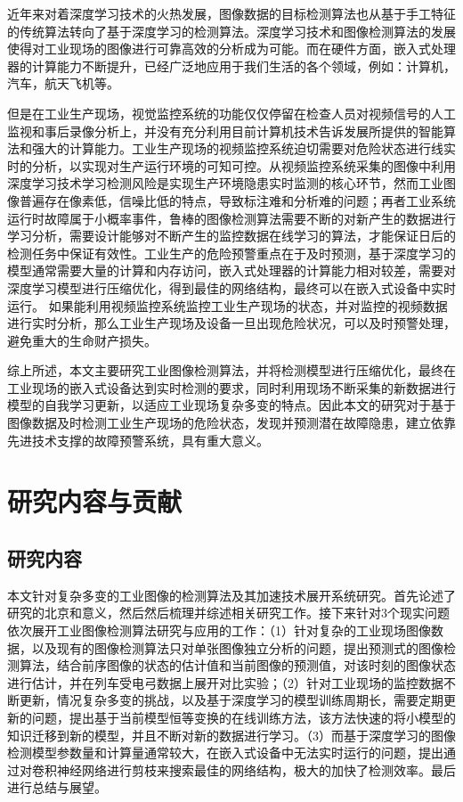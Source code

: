近年来对着深度学习技术的火热发展，图像数据的目标检测算法也从基于手工特征的传统算法转向了基于深度学习的检测算法\cite{deeplearing2018survey}。深度学习技术和图像检测算法的发展使得对工业现场的图像进行可靠高效的分析成为可能。而在硬件方面，嵌入式处理器的计算能力不断提升，已经广泛地应用于我们生活的各个领域，例如：计算机，汽车，航天飞机等。

但是在工业生产现场，视觉监控系统的功能仅仅停留在检查人员对视频信号的人工监视和事后录像分析上，并没有充分利用目前计算机技术告诉发展所提供的智能算法和强大的计算能力\cite{面向视觉监视实时跟踪的动态背景更新方法}。工业生产现场的视频监控系统迫切需要对危险状态进行线实时的分析，以实现对生产运行环境的可知可控。从视频监控系统采集的图像中利用深度学习技术学习检测风险是实现生产环境隐患实时监测的核心环节，然而工业图像普遍存在像素低，信噪比低的特点，导致标注难和分析难的问题；再者工业系统运行时故障属于小概率事件，鲁棒的图像检测算法需要不断的对新产生的数据进行学习分析，需要设计能够对不断产生的监控数据在线学习的算法，才能保证日后的检测任务中保证有效性。工业生产的危险预警重点在于及时预测，基于深度学习的模型通常需要大量的计算和内存访问，嵌入式处理器的计算能力相对较差，需要对深度学习模型进行压缩优化，得到最佳的网络结构，最终可以在嵌入式设备中实时运行。
如果能利用视频监控系统监控工业生产现场的状态，并对监控的视频数据进行实时分析，那么工业生产现场及设备一旦出现危险状况，可以及时预警处理，避免重大的生命财产损失。

综上所述，本文主要研究工业图像检测算法，并将检测模型进行压缩优化，最终在工业现场的嵌入式设备达到实时检测的要求，同时利用现场不断采集的新数据进行模型的自我学习更新，以适应工业现场复杂多变的特点。因此本文的研究对于基于图像数据及时检测工业生产现场的危险状态，发现并预测潜在故障隐患，建立依靠先进技术支撑的故障预警系统，具有重大意义。

\section{研究内容与贡献}
\label{sec:content-contribution}

\subsection{研究内容}
本文针对复杂多变的工业图像的检测算法及其加速技术展开系统研究。首先论述了研究的北京和意义，然后然后梳理并综述相关研究工作。接下来针对3个现实问题依次展开工业图像检测算法研究与应用的工作：（1）针对复杂的工业现场图像数据，以及现有的图像检测算法只对单张图像独立分析的问题，提出预测式的图像检测算法，结合前序图像的状态的估计值和当前图像的预测值，对该时刻的图像状态进行估计，并在列车受电弓数据上展开对比实验；（2）针对工业现场的监控数据不断更新，情况复杂多变的挑战，以及基于深度学习的模型训练周期长，需要定期更新的问题，提出基于当前模型恒等变换的在线训练方法，该方法快速的将小模型的知识迁移到新的模型，并且不断对新的数据进行学习。（3）而基于深度学习的图像检测模型参数量和计算量通常较大，在嵌入式设备中无法实时运行的问题，提出通过对卷积神经网络进行剪枝来搜索最佳的网络结构，极大的加快了检测效率。最后进行总结与展望。

